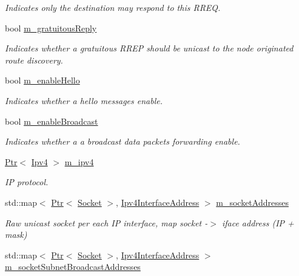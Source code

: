 \begin{DoxyCompactItemize}
\begin{DoxyCompactList}\small\item\em Indicates only the destination may respond to this R\+R\+EQ. \end{DoxyCompactList}\item 
bool \hyperlink{classns3_1_1aodv_1_1RoutingProtocol_a492b1b69b8f91b56ba3301006318a4f3}{m\+\_\+gratuitous\+Reply}
\begin{DoxyCompactList}\small\item\em Indicates whether a gratuitous R\+R\+EP should be unicast to the node originated route discovery. \end{DoxyCompactList}\item 
bool \hyperlink{classns3_1_1aodv_1_1RoutingProtocol_ac1cb4715e9ac42540c051268db368ae8}{m\+\_\+enable\+Hello}
\begin{DoxyCompactList}\small\item\em Indicates whether a hello messages enable. \end{DoxyCompactList}\item 
bool \hyperlink{classns3_1_1aodv_1_1RoutingProtocol_a15b6c0f3a19ecf251f4492a71e95d080}{m\+\_\+enable\+Broadcast}
\begin{DoxyCompactList}\small\item\em Indicates whether a a broadcast data packets forwarding enable. \end{DoxyCompactList}\item 
\hyperlink{classns3_1_1Ptr}{Ptr}$<$ \hyperlink{classns3_1_1Ipv4}{Ipv4} $>$ \hyperlink{classns3_1_1aodv_1_1RoutingProtocol_aee33006b1f9d8b24d4722037ff3fec98}{m\+\_\+ipv4}
\begin{DoxyCompactList}\small\item\em IP protocol. \end{DoxyCompactList}\item 
std\+::map$<$ \hyperlink{classns3_1_1Ptr}{Ptr}$<$ \hyperlink{classns3_1_1Socket}{Socket} $>$, \hyperlink{classns3_1_1Ipv4InterfaceAddress}{Ipv4\+Interface\+Address} $>$ \hyperlink{classns3_1_1aodv_1_1RoutingProtocol_aa3263563cbbd735faafbf17fd4e28a10}{m\+\_\+socket\+Addresses}
\begin{DoxyCompactList}\small\item\em Raw unicast socket per each IP interface, map socket -\/$>$ iface address (IP + mask) \end{DoxyCompactList}\item 
std\+::map$<$ \hyperlink{classns3_1_1Ptr}{Ptr}$<$ \hyperlink{classns3_1_1Socket}{Socket} $>$, \hyperlink{classns3_1_1Ipv4InterfaceAddress}{Ipv4\+Interface\+Address} $>$ \hyperlink{classns3_1_1aodv_1_1RoutingProtocol_a3516a9ee6cc1a0ebde0fdc08680dc7c4}{m\+\_\+socket\+Subnet\+Broadcast\+Addresses}

\end{DoxyCompactItemize}
